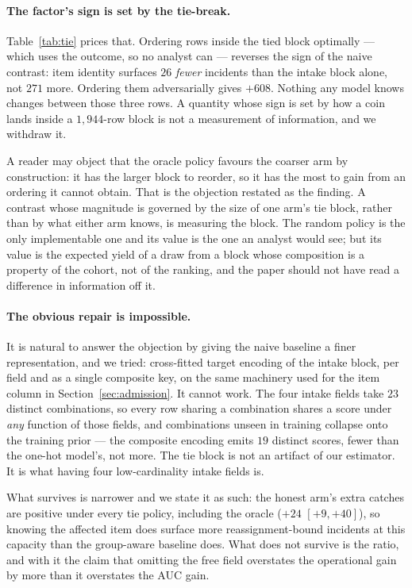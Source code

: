 \documentclass[preprint,12pt]{elsarticle}
\begin{document}
\paragraph{The factor's sign is set by the tie-break.}
Table~\ref{tab:tie} prices that. Ordering rows inside the tied block
optimally --- which uses the outcome, so no analyst can --- reverses the sign
of the naive contrast: item identity surfaces $26$ \emph{fewer} incidents
than the intake block alone, not $271$ more. Ordering them adversarially
gives $+608$. Nothing any model knows changes between those three rows. A
quantity whose sign is set by how a coin lands inside a $1{,}944$-row block
is not a measurement of information, and we withdraw it.

A reader may object that the oracle policy favours the coarser arm by
construction: it has the larger block to reorder, so it has the most to gain
from an ordering it cannot obtain. That is the objection restated as the
finding. A contrast whose magnitude is governed by the size of one arm's tie
block, rather than by what either arm knows, is measuring the block. The
random policy is the only implementable one and its value is the one an
analyst would see; but its value is the expected yield of a draw from a
block whose composition is a property of the cohort, not of the ranking,
and the paper should not have read a difference in information off it.

\paragraph{The obvious repair is impossible.}
It is natural to answer the objection by giving the naive baseline a finer
representation, and we tried: cross-fitted target encoding of the intake
block, per field and as a single composite key, on the same machinery used
for the item column in Section~\ref{sec:admission}. It cannot work. The four
intake fields take $23$ distinct combinations, so every row sharing a
combination shares a score under \emph{any} function of those fields, and
combinations unseen in training collapse onto the training prior --- the
composite encoding emits $19$ distinct scores, fewer than the one-hot
model's, not more. The tie block is not an artifact of our estimator. It is
what having four low-cardinality intake fields is.

What survives is narrower and we state it as such: the honest arm's extra
catches are positive under every tie policy, including the oracle
($+24$ $[+9,+40]$), so knowing the affected item does surface more
reassignment-bound incidents at this capacity than the group-aware baseline
does. What does not survive is the ratio, and with it the claim that omitting
the free field overstates the operational gain by more than it overstates the
AUC gain.
\end{document}
